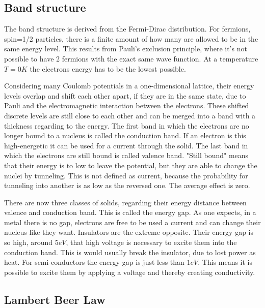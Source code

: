 \documentclass[]{article}
\begin{document}
\subsection{Band structure}
The band structure is derived from the Fermi-Dirac distribution. For fermions, spin=1/2 particles, there is a finite amount of how many are allowed to be in the same energy level. This results from Pauli's exclusion principle, where it's not possible to have 2 fermions with the exact same wave function. At a temperature $T=0K$ the electrons energy has to be the lowest possible. 


Considering many Coulomb potentials in a one-dimensional lattice, their energy levels overlap and shift each other apart, if they are in the same state, due to Pauli and the electromagnetic interaction between the electrons. These shifted discrete levels are still close to each other and can be merged into a band with a thickness regarding to the energy. The first band in which the electrons are no longer bound to a nucleus is called the conduction band. If an electron is this high-energetic it can be used for a current through the solid. The last band in which the electrons are still bound is called valence band. "Still bound" means that their energy is to low to leave the potential, but they are able to change the nuclei by tunneling. This is not defined as current, because the probability for tunneling into another is as low as the reversed one. The average effect is zero.

There are now three classes of solids, regarding their energy distance between valence and conduction band. This is called the energy gap. As one expects, in a metal there is no gap, electrons are free to be used a current and can change their nucleus like they want. Insulators are the extreme opposite. Their energy gap is so high, around $5eV$, that high voltage is necessary to excite them into the conduction band. This is would usually break the insulator, due to lost power as heat. 
For semi-conductors the energy gap is just less than $1eV$. This means it is possible to excite them by applying a voltage and thereby creating conductivity.



\subsection{Lambert Beer Law}
\end{document}
